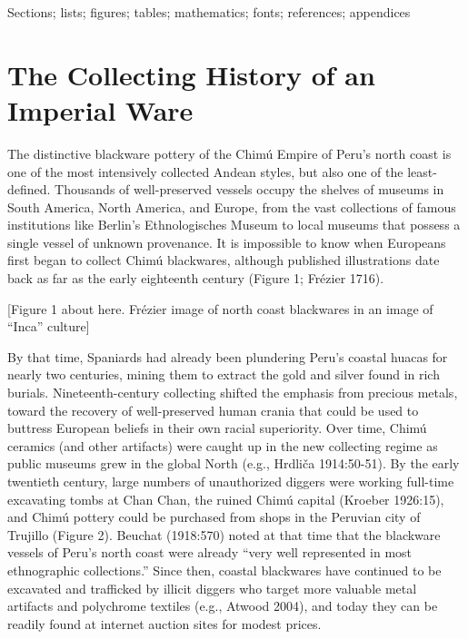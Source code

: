 \documentclass[]{interact}
\theoremstyle{plain}%
\theoremstyle{definition}
\theoremstyle{remark}
\begin{document}
\begin{keywords}
Sections; lists; figures; tables; mathematics; fonts; references;
appendices
\end{keywords}

\hypertarget{the-collecting-history-of-an-imperial-ware}{%
\section{The Collecting History of an Imperial
Ware}\label{the-collecting-history-of-an-imperial-ware}}

The distinctive blackware pottery of the Chimú Empire of Peru's north
coast is one of the most intensively collected Andean styles, but also
one of the least-defined. Thousands of well-preserved vessels occupy the
shelves of museums in South America, North America, and Europe, from the
vast collections of famous institutions like Berlin's Ethnologisches
Museum to local museums that possess a single vessel of unknown
provenance. It is impossible to know when Europeans first began to
collect Chimú blackwares, although published illustrations date back as
far as the early eighteenth century (Figure 1; Frézier 1716).

{[}Figure 1 about here. Frézier image of north coast blackwares in an
image of ``Inca'' culture{]}

By that time, Spaniards had already been plundering Peru's coastal
huacas for nearly two centuries, mining them to extract the gold and
silver found in rich burials. Nineteenth-century collecting shifted the
emphasis from precious metals, toward the recovery of well-preserved
human crania that could be used to buttress European beliefs in their
own racial superiority. Over time, Chimú ceramics (and other artifacts)
were caught up in the new collecting regime as public museums grew in
the global North (e.g., Hrdliča 1914:50-51). By the early twentieth
century, large numbers of unauthorized diggers were working full-time
excavating tombs at Chan Chan, the ruined Chimú capital (Kroeber
1926:15), and Chimú pottery could be purchased from shops in the
Peruvian city of Trujillo (Figure 2). Beuchat (1918:570) noted at that
time that the blackware vessels of Peru's north coast were already
``very well represented in most ethnographic collections.'' Since then,
coastal blackwares have continued to be excavated and trafficked by
illicit diggers who target more valuable metal artifacts and polychrome
textiles (e.g., Atwood 2004), and today they can be readily found at
internet auction sites for modest prices.
\end{document}
